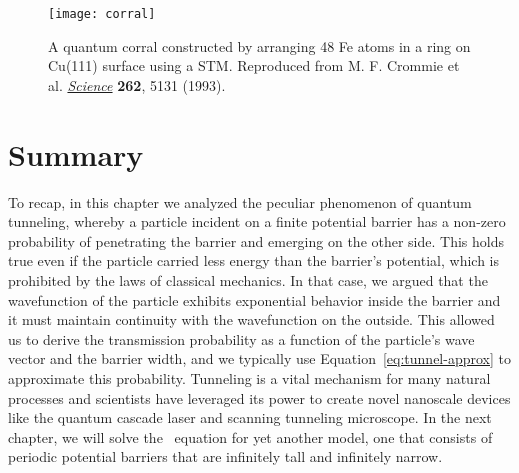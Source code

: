 \begin{figure}[!h]
	\centering
	\texttt{[image: corral]}
	\caption{A quantum corral constructed by arranging 48 Fe atoms in a ring on Cu(111) surface using a STM. Reproduced from M. F. Crommie et al. \href{http://science.sciencemag.org/content/262/5131/218}{\emph{Science}} \textbf{262}, 5131 (1993).}
	\label{fig:corral}
\end{figure}




\section{Summary}
To recap, in this chapter we analyzed the peculiar phenomenon of quantum tunneling, whereby a particle incident on a finite potential barrier has a non-zero probability of penetrating the barrier and emerging on the other side. This holds true even if the particle carried less energy than the barrier's potential, which is prohibited by the laws of classical mechanics. In that case, we argued that the wavefunction of the particle exhibits exponential behavior inside the barrier and it must maintain continuity with the wavefunction on the outside. This allowed us to derive the transmission probability as a function of the particle's wave vector and the barrier width, and we typically use Equation~\ref{eq:tunnel-approx} to approximate this probability. Tunneling is a vital mechanism for many natural processes and scientists have leveraged its power to create novel nanoscale devices like the quantum cascade laser and scanning tunneling microscope. In the next chapter, we will solve the \Sch\ equation for yet another model, one that consists of periodic potential barriers that are infinitely tall and infinitely narrow.


%
